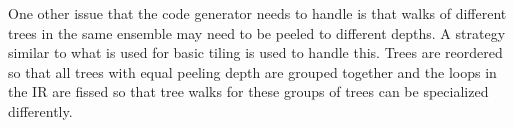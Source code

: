 One other issue that the code generator needs to handle is that walks of different trees in the same ensemble may 
need to be peeled to different depths. A strategy similar to what is used for basic tiling is used to handle this.
Trees are reordered so that all trees 
with equal peeling depth are grouped together and the loops in the IR are fissed so that tree walks 
for these groups of trees can be specialized differently.
